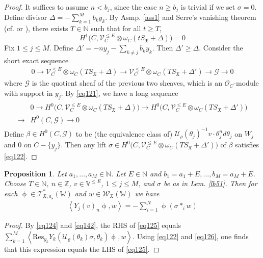 \documentclass[11pt,b5paper,notitlepage]{article}
\theoremstyle{definition}
\theoremstyle{plain}
\newtheorem{pp}[df]{Proposition}
\newcommand{\fk}{\mathfrak}
\newcommand{\mc}{\mathcal}
\newcommand{\Res}{\mathrm{Res}}
\newcommand{\SV}{\mathscr{V}}
\newcommand{\scr}{\mathscr}
\newcommand{\Vbb}{\mathbb V}
\newcommand{\Wbb}{\mathbb W}
\newcommand{\Nbb}{\mathbb N}
\newcommand{\Zbb}{\mathbb Z}
\newcommand{\<}{\left\langle}
\renewcommand{\>}{\right\rangle}
\newcommand{\fx}{\mathfrak{X}}
\numberwithin{equation}{section}
\begin{document}
\begin{proof}
It suffices to assume $n< b_j$, since the case $n\geq b_j$ is trivial if we set $\sigma=0$. Define divisor $\varDelta=-\sum_{k=1}^M b_ky_k$. By Asmp. \ref{ass1} and Serre's vanishing theorem (cf. \cite[Prop. 5.2.7]{Huy} or \cite[Thm. IV.2.1]{BaSt}), there exists $T\in \Nbb$ such that for all $t\geq T$,
    \begin{equation}
    H^1\big(C,\SV_C^{\leq E}\otimes \omega_C(tS_\fx+\varDelta)\big)=0  \label{eq121}
    \end{equation}
Fix $1\leq j\leq M$. Define $\varDelta'=-ny_j-\sum_{k\neq j}b_ky_k$. Then $\varDelta'\geq\varDelta$. Consider the short exact sequence
\begin{align*}
0\rightarrow \SV_C^{\leq E}\otimes \omega_C(TS_\fx+\varDelta)\rightarrow \SV_C^{\leq E}\otimes \omega_C(TS_\fx+\varDelta')\rightarrow\scr G\rightarrow 0
\end{align*} 
where $\scr G$ is the quotient sheaf of the previous two sheaves, which is an $\mc O_C$-module with support in $y_j$. By \eqref{eq121}, we have a long sequence
\begin{align}
\begin{aligned}
&0\rightarrow H^0\big(C,\SV_C^{\leq E}\otimes \omega_C(TS_\fx+\varDelta)\big)\rightarrow H^0\big(C,\SV_C^{\leq E}\otimes \omega_C(TS_\fx+\varDelta')\big)\\
\rightarrow&H^0(C,\scr G)\rightarrow 0
\end{aligned}
\end{align}
Define $\beta\in H^0(C,\scr G)$ to be (the equivalence class of) $\mc U_\varrho(\theta_j)^{-1}v\cdot\theta_j^nd\theta_j$ on $W_j$ and $0$ on $C-\{y_j\}$. Then any lift $\sigma\in H^0\big(C,\SV_C^{\leq E}\otimes \omega_C(TS_\fx+\varDelta')\big)$ of $\beta$ satisfies \eqref{eq122}. 
\end{proof}




\begin{pp}\label{lb52}
Let $a_1,\dots,a_M\in\Nbb$. Let $E\in\Nbb$ and $b_1=a_1+E,\dots,b_M=a_M+E$. Choose $T\in\Nbb$, $n\in\Zbb$, $v\in\Vbb^{\leq E}$, $1\leq j\leq M$, and $\sigma$ be as in Lem. \ref{lb51}. Then for each $\upphi\in\scr T_{\fk X,a_\star}^*(\Wbb)$ and $w\in\scr W_\fx(\Wbb)$ we have
\begin{align}
\<Y_j(v)_n\upphi,w\>=-\sum_{i=1}^N \upphi (\sigma*_i w)  \label{eq125}
\end{align}
\end{pp}


\begin{proof}
By \eqref{eq124} and \eqref{eq142}, the RHS of \eqref{eq125} equals $\sum_{k=1}^M\<\Res_{y_k} Y_k(\mc U_\varrho(\theta_k)\sigma,\theta_k)\upphi,w\>$.
Using \eqref{eq122} and \eqref{eq126}, one finds that this expression equals the LHS of \eqref{eq125}.
\end{proof}
\end{document}
